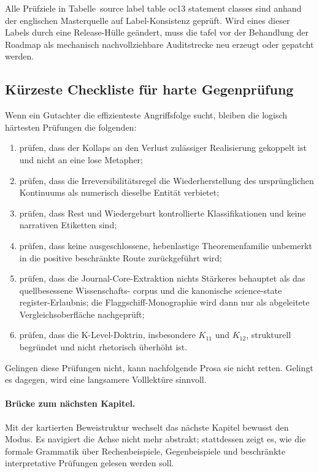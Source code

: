 Alle Prüfziele in Tabelle~source label table oc13 statement classes sind anhand der englischen Masterquelle
auf Label-Konsistenz geprüft. Wird eines dieser Labels durch eine Release-Hülle geändert, muss die
tafel vor der Behandlung der Roadmap als mechanisch nachvollziehbare Auditstrecke neu erzeugt oder
gepatcht werden.

\subsection{Kürzeste Checkliste für harte Gegenprüfung}

Wenn ein Gutachter die effizienteste Angriffsfolge sucht, bleiben die logisch härtesten Prüfungen
die folgenden:

\begin{enumerate}
\item prüfen, dass der Kollaps an den Verlust zulässiger Realisierung gekoppelt ist und nicht an eine lose Metapher;
\item prüfen, dass die Irreversibilitätsregel die Wiederherstellung des ursprünglichen Kontinuums als numerisch
      dieselbe Entität verbietet;
\item prüfen, dass Rest und Wiedergeburt kontrollierte Klassifikationen und keine narrativen Etiketten sind;
\item prüfen, dass keine ausgeschlossene, hebenlastige Theoremenfamilie unbemerkt in die positive beschränkte
      Route zurückgeführt wird;
\item prüfen, dass die Journal-Core-Extraktion nichts Stärkeres behauptet als das quellbesessene Wissenschafts-
      corpus und die kanonische science-state register-Erlaubnis; die Flaggschiff-Monographie wird dann nur als abgeleitete
      Vergleichsoberfläche nachgeprüft;
\item prüfen, dass die K-Level-Doktrin, insbesondere \(K_{11}\) und \(K_{12}\), strukturell begründet und nicht
      rhetorisch überhöht ist.
\end{enumerate}

Gelingen diese Prüfungen nicht, kann nachfolgende Prosa sie nicht retten. Gelingt
es dagegen, wird eine langsamere Volllektüre sinnvoll.

\paragraph{Brücke zum nächsten Kapitel.}
Mit der kartierten Beweistruktur wechselt das nächste Kapitel bewusst den Modus. Es navigiert die Achse nicht
mehr abstrakt; stattdessen zeigt es, wie die formale Grammatik über Rechenbeispiele, Gegenbeispiele
und beschränkte interpretative Prüfungen gelesen werden soll.

\clearpage
